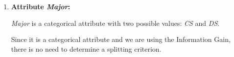 \documentclass[
english,
smallborders
]{i6prcsht}
\begin{document}
\begin{solution}
\begin{enumerate}
\begin{enumerate}
\begin{enumerate}
\begin{enumerate}
				                  \end{enumerate}
				                  
				                  Therefore, the Information Gain for the attribute \textit{Age} is $0,0817$ (if we split at $25,0$).
				                  
				            \item \textbf{Attribute \textit{Major}:}
				                  
				                  \textit{Major} is a categorical attribute with two possible values: \textit{CS} and \textit{DS}.
				                  
				                  Since it is a categorical attribute and we are using the Information Gain, there is no need to determine a splitting criterion.
				                  

\end{enumerate}
\end{enumerate}
\end{enumerate}
\end{solution}
\end{document}
